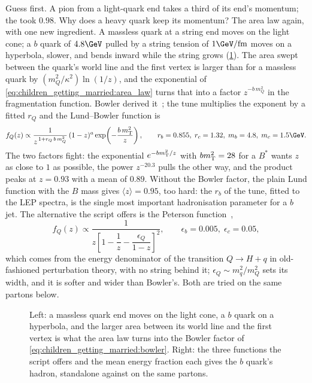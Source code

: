 Guess first. A pion from a light-quark end takes a third of its end's
momentum; the \Bstarbar took $0.98$. Why does a heavy quark keep its
momentum? The area law again, with one new ingredient. A massless quark at
a string end moves on the light cone; a $b$ quark of $4.8\GeV$ pulled by a
string tension of $1\GeV/\mathrm{fm}$ moves on a hyperbola, slower, and
bends inward while the string grows (\cref{fig:children_getting_married:bowler_sketch}).
The area swept between the quark's world line and the first vertex is
larger than for a massless quark by $(m_Q^2/\kappa^2)\ln(1/z)$, and the
exponential of \cref{eq:children_getting_married:area_law} turns that into
a factor $z^{-b\,m_Q^2}$ in the fragmentation function. Bowler derived
it~\cite{Bowler:1981sb}; the tune multiplies the exponent by a fitted
$r_Q$ and the Lund--Bowler function is
\begin{equation}
  f_Q(z)\propto\frac{1}{z^{\,1+r_Q\,b\,m_Q^2}}\,(1-z)^a\exp\!\left(-\frac{b\,\mT^2}{z}\right),
  \qquad r_b=0.855,\; r_c=1.32,\; m_b=4.8,\; m_c=1.5\GeV.
  \label{eq:children_getting_married:bowler}
\end{equation}
The two factors fight: the exponential $e^{-bm_{\mathrm{T}}^2/z}$ with $bm_{\mathrm{T}}^2=28$ for
a $B^*$ wants $z$ as close to $1$ as possible, the power $z^{-20.3}$ pulls
the other way, and the product peaks at $z=0.93$ with a mean of $0.89$.
Without the Bowler factor, the plain Lund function with the $B$ mass gives
$\langle z\rangle=0.95$, too hard: the $r_b$ of the tune, fitted to the LEP
spectra, is the single most important hadronisation parameter for a $b$
jet. The alternative the script offers is the Peterson
function~\cite{Peterson:1982ak},
\begin{equation}
  f_Q(z)\propto\frac{1}{z\left[1-\dfrac1z-\dfrac{\epsilon_Q}{1-z}\right]^2},
  \qquad \epsilon_b=0.005,\;\epsilon_c=0.05,
  \label{eq:children_getting_married:peterson}
\end{equation}
which comes from the energy denominator of the transition
$Q\to H+q$ in old-fashioned perturbation theory, with no string behind it;
$\epsilon_Q\sim m_q^2/m_Q^2$ sets its width, and it is softer and wider
than Bowler's. Both are tried on the same partons below.

\begin{figure}[htbp]\centering
\resizebox{\textwidth}{!}{}
\caption[The heavy end of the string and the three fragmentation
functions]{Left: a massless quark end moves on the light cone, a $b$ quark
on a hyperbola, and the larger area between its world line and the first
vertex is what the area law turns into the Bowler factor of
\cref{eq:children_getting_married:bowler}. Right: the three functions the
script offers and the mean energy fraction each gives the $b$ quark's
hadron, standalone against \PYTHIA on the same partons.}
\label{fig:children_getting_married:bowler_sketch}
\end{figure}

